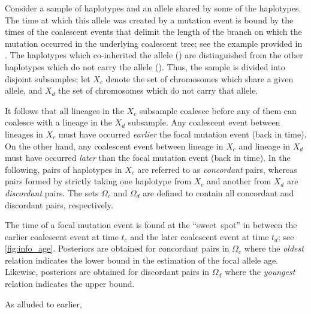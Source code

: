 Consider a sample of haplotypes and an allele shared by some of the haplotypes.
The time at which this allele was created by a mutation event is bound by the times of the  coalescent events that delimit the length of the branch on which the mutation occurred in the underlying coalescent tree; see the example provided in .
The haplotypes which co-inherited the allele () are distinguished from the other haplotypes which do not carry the allele ().
Thus, the sample is divided into  disjoint subsamples; let $X_c$ denote the set of chromosomes which share a given allele, and $X_d$ the set of chromosomes which do not carry that allele.

%

%

It follows that all lineages in the $X_c$ subsample coalesce before any of them can coalesce with a lineage in the $X_d$ subsample.
Any coalescent event between  lineages in $X_c$ must have occurred \emph{earlier}  the focal mutation event (back in time).
On the other hand, any coalescent event between  lineage in $X_c$ and  lineage in $X_d$ must have occurred \emph{later} than the focal mutation event (back in time).
In the following, pairs of haplotypes in $X_c$ are referred to as \emph{concordant} pairs, whereas pairs formed by strictly taking one haplotype from $X_c$ and another from $X_d$ are \emph{discordant} pairs.
The sets $\Omega_c$ and $\Omega_d$ are defined to contain all concordant and discordant pairs, respectively.


The time of a focal mutation event is found at the ``sweet~spot'' in between the earlier coalescent event at time $t_c$ and the later coalescent event at time $t_d$; see \cref{fig:info_age}.
Posteriors are obtained for concordant pairs in $\Omega_c$ where the \emph{oldest} relation indicates the lower bound in the estimation of the focal allele age.
Likewise, posteriors are obtained for discordant pairs in $\Omega_d$ where the \emph{youngest} relation indicates the upper bound.

As alluded to earlier,


